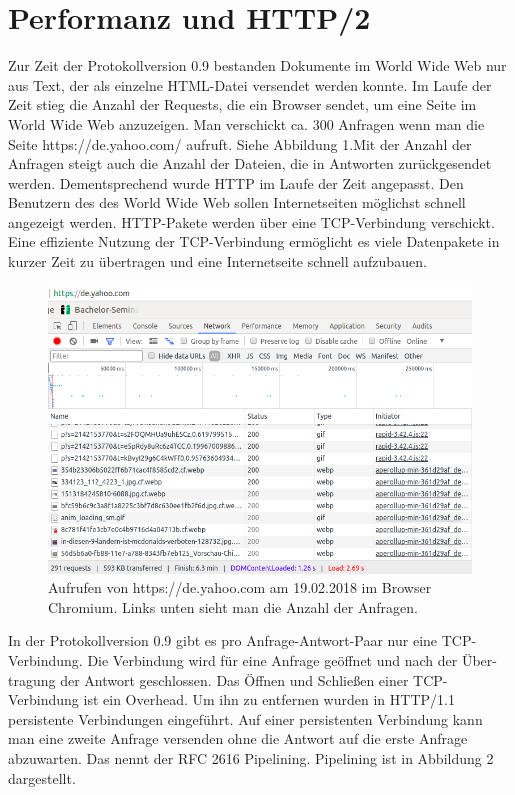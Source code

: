 \documentclass{llncs}
\begin{document}
\section{Performanz und HTTP/2}
Zur Zeit der Protokollversion 0.9 bestanden Dokumente im World Wide Web nur aus Text, der als einzelne HTML-Datei versendet werden konnte. Im Laufe der Zeit stieg die Anzahl der Requests, die ein Browser sendet, um eine Seite im World Wide Web anzuzeigen. Man verschickt ca. 300 Anfragen wenn man die Seite https://de.yahoo.com/ aufruft. Siehe Abbildung 1.\newline Mit der Anzahl der Anfragen steigt auch die Anzahl der Dateien, die in Antworten zurückgesendet werden. Dementsprechend wurde HTTP im Laufe der Zeit angepasst. Den Benutzern des des World Wide Web sollen Internetseiten möglichst schnell angezeigt werden.
HTTP-Pakete werden über eine TCP-Verbindung verschickt. Eine effiziente Nutzung der TCP-Verbindung ermöglicht es viele Datenpakete in kurzer Zeit zu übertragen und eine Internetseite schnell aufzubauen.
\begin{figure}[!ht]
\includegraphics[width=\columnwidth]{yahooRequests}
\caption{Aufrufen von https://de.yahoo.com am 19.02.2018 im Browser Chromium. Links unten sieht man die Anzahl der Anfragen.}
\end{figure}


In der Protokollversion 0.9 gibt es pro Anfrage-Antwort-Paar nur eine TCP-Verbindung. Die Verbindung wird für eine Anfrage geöffnet und nach der Über-tragung der Antwort geschlossen. Das Öffnen und Schließen einer TCP-Verbindung ist ein Overhead. Um ihn zu entfernen wurden in HTTP/1.1 persistente Verbindungen eingeführt. Auf einer persistenten Verbindung kann man eine zweite Anfrage versenden ohne die Antwort auf die erste Anfrage abzuwarten. Das nennt der RFC 2616 Pipelining. Pipelining ist in Abbildung 2 dargestellt.
\end{document}
